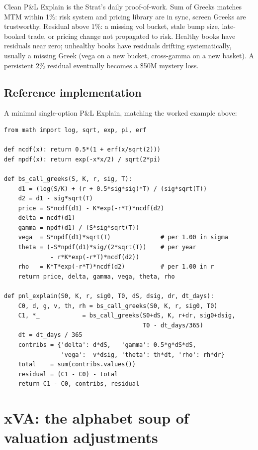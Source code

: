 \begin{intuitionbox}
Clean P\&L Explain is the Strat's daily proof-of-work.  Sum of
Greeks matches MTM within 1\%: risk system and pricing library are
in sync, screen Greeks are trustworthy.  Residual above 1\%: a
missing vol bucket, stale bump size, late-booked trade, or pricing
change not propagated to risk.  Healthy books have residuals near
zero; unhealthy books have residuals drifting systematically,
usually a missing Greek (vega on a new bucket, cross-gamma on a new
basket).  A persistent 2\% residual eventually becomes a \$50M
mystery loss.
\end{intuitionbox}

\subsection{Reference implementation}

A minimal single-option P\&L Explain, matching the worked example
above:

\begin{lstlisting}[caption={Single-option P\&L Explain.}]
from math import log, sqrt, exp, pi, erf

def ncdf(x): return 0.5*(1 + erf(x/sqrt(2)))
def npdf(x): return exp(-x*x/2) / sqrt(2*pi)

def bs_call_greeks(S, K, r, sig, T):
    d1 = (log(S/K) + (r + 0.5*sig*sig)*T) / (sig*sqrt(T))
    d2 = d1 - sig*sqrt(T)
    price = S*ncdf(d1) - K*exp(-r*T)*ncdf(d2)
    delta = ncdf(d1)
    gamma = npdf(d1) / (S*sig*sqrt(T))
    vega  = S*npdf(d1)*sqrt(T)              # per 1.00 in sigma
    theta = (-S*npdf(d1)*sig/(2*sqrt(T))    # per year
             - r*K*exp(-r*T)*ncdf(d2))
    rho   = K*T*exp(-r*T)*ncdf(d2)          # per 1.00 in r
    return price, delta, gamma, vega, theta, rho

def pnl_explain(S0, K, r, sig0, T0, dS, dsig, dr, dt_days):
    C0, d, g, v, th, rh = bs_call_greeks(S0, K, r, sig0, T0)
    C1, *_            = bs_call_greeks(S0+dS, K, r+dr, sig0+dsig,
                                       T0 - dt_days/365)
    dt = dt_days / 365
    contribs = {'delta': d*dS,   'gamma': 0.5*g*dS*dS,
                'vega':  v*dsig, 'theta': th*dt, 'rho': rh*dr}
    total    = sum(contribs.values())
    residual = (C1 - C0) - total
    return C1 - C0, contribs, residual
\end{lstlisting}


\section{xVA: the alphabet soup of valuation adjustments}
\label{sec:xva}

